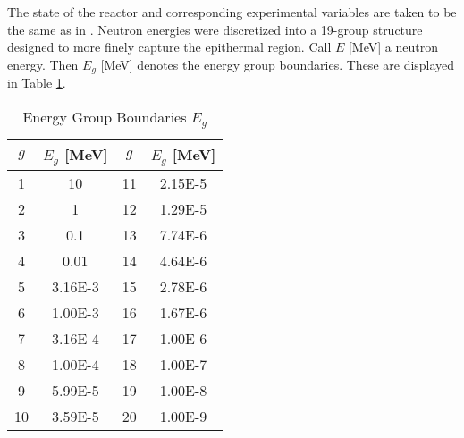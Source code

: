 \documentclass{physor2012}
\begin{document}
The state of the reactor and corresponding experimental variables are taken
to be the same as in \cite{}.  Neutron energies were discretized into a 19-group
structure designed to more finely capture the epithermal region.  Call $E$ [MeV]
a neutron energy. Then $E_g$ [MeV] denotes the energy group boundaries.
These are displayed in Table \ref{group_boundaries}.
\begin{table}[htbp]
\begin{center}
\caption{Energy Group Boundaries $E_g$}
\label{group_boundaries}
\begin{tabular}{|c|c||c|c|}
\hline
\textbf{$g$} & \textbf{$E_g$ [MeV]} & \textbf{$g$} & \textbf{$E_g$ [MeV]} \\
\hline
1  & 10      & 11 & 2.15E-5 \\
2  & 1       & 12 & 1.29E-5 \\
3  & 0.1     & 13 & 7.74E-6 \\
4  & 0.01    & 14 & 4.64E-6 \\
5  & 3.16E-3 & 15 & 2.78E-6 \\
6  & 1.00E-3 & 16 & 1.67E-6 \\
7  & 3.16E-4 & 17 & 1.00E-6 \\
8  & 1.00E-4 & 18 & 1.00E-7 \\
9  & 5.99E-5 & 19 & 1.00E-8 \\
10 & 3.59E-5 & 20 & 1.00E-9 \\
\hline
\end{tabular}
\end{center}
\end{table}
\end{document}
